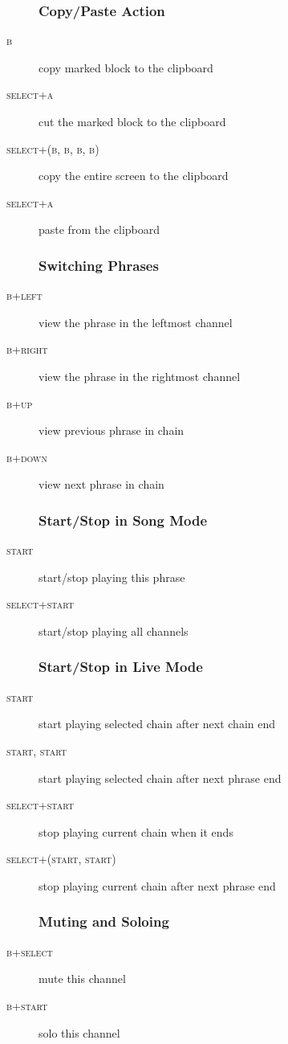 \begin{description}
\subsubsection{Copy/Paste Action}
\item[\textsc{b}] copy marked block to the clipboard
\item[\textsc{select+a}] cut the marked block to the clipboard

\item[\textsc{select+(b, b, b, b)}] copy the entire screen to the clipboard
\item[\textsc{select+a}] paste from the clipboard

\subsubsection{Switching Phrases}
\item[\textsc{b+left}] view the phrase in the leftmost channel
\item[\textsc{b+right}] view the phrase in the rightmost channel
\item[\textsc{b+up}] view previous phrase in chain
\item[\textsc{b+down}] view next phrase in chain

\subsubsection{Start/Stop in Song Mode}

\item[\textsc{start}] start/stop playing this phrase
\item[\textsc{select+start}] start/stop playing all channels

\subsubsection{Start/Stop in Live Mode}
\item[\textsc{start}] start playing selected chain after next chain end
\item[\textsc{start, start}] start playing selected chain after next phrase end
\item[\textsc{select+start}] stop playing current chain when it ends
\item[\textsc{select+(start, start)}] stop playing current chain after next phrase end

\subsubsection{Muting and Soloing}
\item[\textsc{b+select}] mute this channel
\item[\textsc{b+start}] solo this channel
\end{description}



